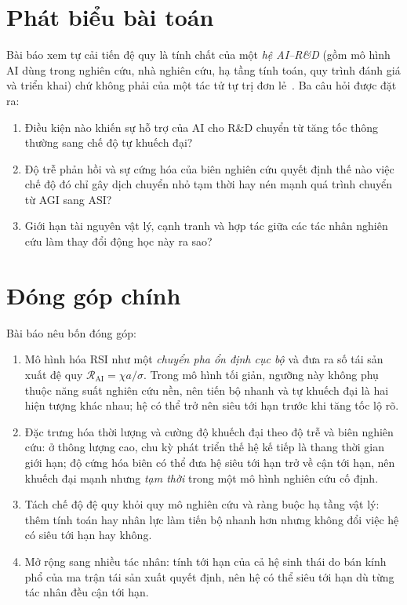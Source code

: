 \documentclass[12pt,a4paper,openany]{report}
\numberwithin{equation}{chapter}   %
\theoremstyle{definition}
\newcommand{\RAI}{\mathcal{R}_{\mathrm{AI}}}
\begin{document}
\section{Phát biểu bài toán}\label{sec:baitoan}
Bài báo xem tự cải tiến đệ quy là tính chất của một \emph{hệ AI--R\&D} (gồm mô hình AI dùng trong nghiên cứu, nhà nghiên cứu, hạ tầng tính toán, quy trình đánh giá và triển khai) chứ không phải của một tác tử tự trị đơn lẻ~\cite{burtsev2026}. Ba câu hỏi được đặt ra:
\begin{enumerate}[label=(\arabic*)]
  \item Điều kiện nào khiến sự hỗ trợ của AI cho R\&D chuyển từ tăng tốc thông thường sang chế độ tự khuếch đại?
  \item Độ trễ phản hồi và sự cứng hóa của biên nghiên cứu quyết định thế nào việc chế độ đó chỉ gây dịch chuyển nhỏ tạm thời hay nén mạnh quá trình chuyển từ AGI sang ASI?
  \item Giới hạn tài nguyên vật lý, cạnh tranh và hợp tác giữa các tác nhân nghiên cứu làm thay đổi động học này ra sao?
\end{enumerate}

\section{Đóng góp chính}\label{sec:donggop}
Bài báo nêu bốn đóng góp:
\begin{enumerate}[label=(\arabic*)]
  \item Mô hình hóa RSI như một \emph{chuyển pha ổn định cục bộ} và đưa ra số tái sản xuất đệ quy $\RAI=\chi a/\sigma$. Trong mô hình tối giản, ngưỡng này không phụ thuộc năng suất nghiên cứu nền, nên tiến bộ nhanh và tự khuếch đại là hai hiện tượng khác nhau; hệ có thể trở nên siêu tới hạn trước khi tăng tốc lộ rõ.
  \item Đặc trưng hóa thời lượng và cường độ khuếch đại theo độ trễ và biên nghiên cứu: ở thông lượng cao, chu kỳ phát triển thế hệ kế tiếp là thang thời gian giới hạn; độ cứng hóa biên có thể đưa hệ siêu tới hạn trở về cận tới hạn, nên khuếch đại mạnh nhưng \emph{tạm thời} trong một mô hình nghiên cứu cố định.
  \item Tách chế độ đệ quy khỏi quy mô nghiên cứu và ràng buộc hạ tầng vật lý: thêm tính toán hay nhân lực làm tiến bộ nhanh hơn nhưng không đổi việc hệ có siêu tới hạn hay không.
  \item Mở rộng sang nhiều tác nhân: tính tới hạn của cả hệ sinh thái do bán kính phổ của ma trận tái sản xuất quyết định, nên hệ có thể siêu tới hạn dù từng tác nhân đều cận tới hạn.
\end{enumerate}
\end{document}
